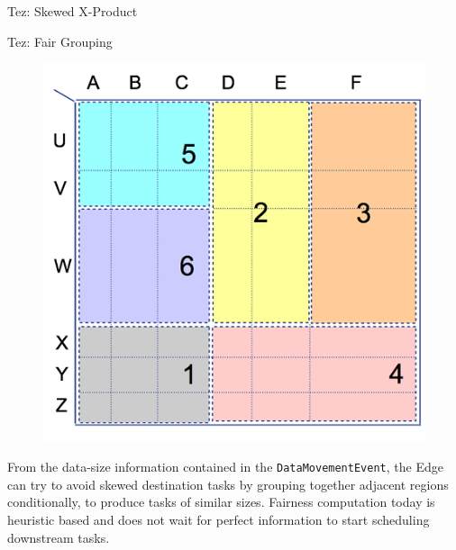 \documentclass[final]{beamer}
\newlength{\onecolwid}
\begin{document}
\begin{frame}[t]
\begin{columns}[t]
\begin{column}{\onecolwid}
\begin{block}{Tez: Skewed X-Product}
\end{block}



\begin{block}{Tez: Fair Grouping}

\begin{figure}
\includegraphics{figures/Data-Grouping.png}
\end{figure}

From the data-size information contained in the \texttt{DataMovementEvent}, the Edge can try to 
avoid skewed destination tasks by grouping together adjacent regions conditionally, to produce 
tasks of similar sizes. Fairness computation today is heuristic based and does not wait for 
perfect information to start scheduling downstream tasks.
\end{block}


\end{column} %

\end{columns} %

\end{frame} %
\end{document}
